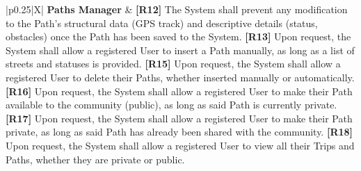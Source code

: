 {\begin{xltabular}{\textwidth}{|p{0.25\textwidth}|X|}
    \textbf{Paths Manager} & 
    \textbf{[R12]} The System shall prevent any modification to the Path's structural data (GPS track) and descriptive details (status, obstacles) once the Path has been saved to the System. \newline
    \textbf{[R13]} Upon request, the System shall allow a registered User to insert a Path manually, as long as a list of streets and statuses is provided. \newline
    \textbf{[R15]} Upon request, the System shall allow a registered User to delete their Paths, whether inserted manually or automatically. \newline
    \textbf{[R16]} Upon request, the System shall allow a registered User to make their Path available to the community (public), as long as said Path is currently private. \newline
    \textbf{[R17]} Upon request, the System shall allow a registered User to make their Path private, as long as said Path has already been shared with the community. \newline
    \textbf{[R18]} Upon request, the System shall allow a registered User to view all their Trips and Paths, whether they are private or public. \\
    \hline
    

\end{xltabular}}
